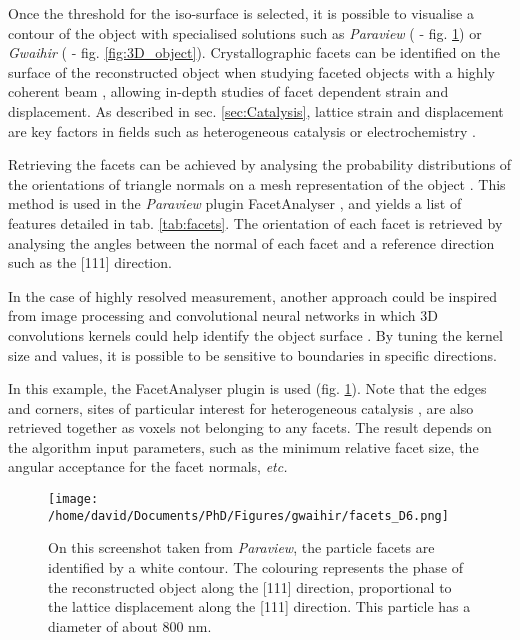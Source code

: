 Once the threshold for the iso-surface is selected, it is possible to visualise a contour of the object with specialised solutions such as \textit{Paraview} (\cite{Ahrens2001} - fig. \ref{fig:facets_paraview}) or \textit{Gwaihir} (\cite{Simonne2022} - fig. \ref{fig:3D_object}).
Crystallographic facets can be identified on the surface of the reconstructed object when studying faceted objects with a highly coherent beam \parencite{richard_crystallographic_2018}, allowing in-depth studies of facet dependent strain and displacement.
As described in sec. \ref{sec:Catalysis}, lattice strain and displacement are key factors in fields such as heterogeneous catalysis \parencite{ulvestad_situ_2016,kim_active_2018,fernandez_situ_2019,Passos2020,Carnis2021} or electrochemistry \parencite{vicente_bragg_2021, Atlan2023}.

Retrieving the facets can be achieved by analysing the probability distributions of the orientations of triangle normals on a mesh representation of the object \parencite{Grothausmann2012}.
This method is used in the \textit{Paraview} plugin FacetAnalyser \parencite{GrothausmannBeare2015}, and yields a list of features detailed in tab. \ref{tab:facets}.
The orientation of each facet is retrieved by analysing the angles between the normal of each facet and a reference direction such as the [111] direction.

In the case of highly resolved measurement, another approach could be inspired from  image processing and convolutional neural networks in which 3D convolutions kernels could help identify the object surface \parencite{RaschkaMirjalili2019}.
By tuning the kernel size and values, it is possible to be sensitive to boundaries in specific directions.

In this example, the FacetAnalyser plugin is used (fig. \ref{fig:facets_paraview}). Note that the edges and corners, sites of particular interest for heterogeneous catalysis \parencite{Taylor1925}, are also retrieved together as voxels not belonging to any facets.
The result depends on the algorithm input parameters, such as the minimum relative facet size, the angular acceptance for the facet normals, \textit{etc.}

\begin{figure}
    \centering
    \texttt{[image: /home/david/Documents/PhD/Figures/gwaihir/facets\_D6.png]}
    \caption{
    On this screenshot taken from \textit{Paraview}, the particle facets are identified by a white contour.
    The colouring represents the phase of the reconstructed object along the [111] direction, proportional to the lattice displacement along the [111] direction.
    This particle has a diameter of about 800 nm.
    }
    \label{fig:facets_paraview}
\end{figure}

